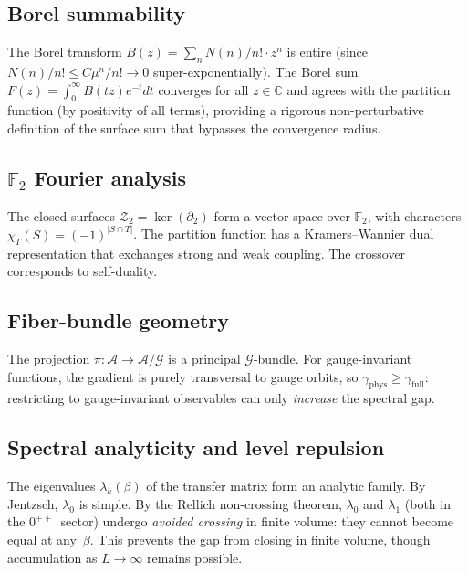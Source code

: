 \documentclass[12pt,a4paper]{article}
\newcommand{\C}{\mathbb{C}}
\newcommand{\F}{\mathbb{F}}
\begin{document}
\subsection{Borel summability}

The Borel transform $B(z)=\sum_n N(n)/n!\cdot z^n$ is entire (since $N(n)/n!\le C\mu^n/n!\to 0$ super-exponentially). The Borel sum $F(z)=\int_0^\infty B(tz)e^{-t}dt$ converges for all $z\in\C$ and agrees with the partition function (by positivity of all terms), providing a rigorous non-perturbative definition of the surface sum that bypasses the convergence radius.

\subsection{$\F_2$ Fourier analysis}

The closed surfaces $\mathcal{Z}_2=\ker(\partial_2)$ form a vector space over $\F_2$, with characters $\chi_T(S)=(-1)^{|S\cap T|}$. The partition function has a Kramers--Wannier dual representation that exchanges strong and weak coupling. The crossover corresponds to self-duality.

\subsection{Fiber-bundle geometry}

The projection $\pi:\mathcal{A}\to\mathcal{A}/\mathcal{G}$ is a principal $\mathcal{G}$-bundle. For gauge-invariant functions, the gradient is purely transversal to gauge orbits, so $\gamma_{\mathrm{phys}}\ge\gamma_{\mathrm{full}}$: restricting to gauge-invariant observables can only \emph{increase} the spectral gap.

\subsection{Spectral analyticity and level repulsion}

The eigenvalues $\lambda_k(\beta)$ of the transfer matrix form an analytic family. By Jentzsch, $\lambda_0$ is simple. By the Rellich non-crossing theorem, $\lambda_0$ and $\lambda_1$ (both in the $0^{++}$~sector) undergo \emph{avoided crossing} in finite volume: they cannot become equal at any~$\beta$. This prevents the gap from closing in finite volume, though accumulation as $L\to\infty$ remains possible.

\end{document}
